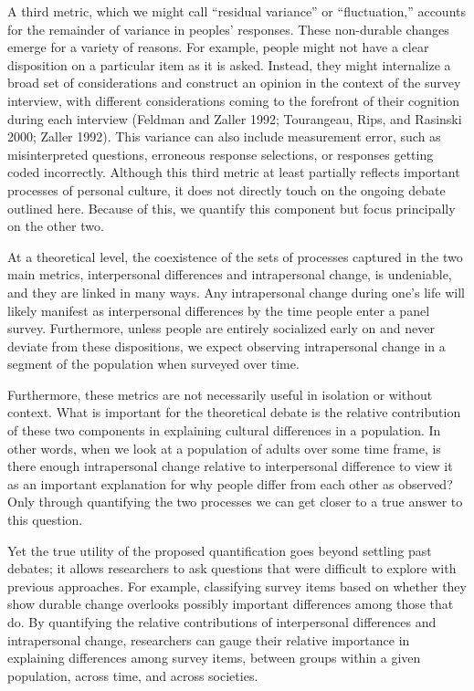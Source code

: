 \documentclass[
  12pt,
]{article}
\begin{document}
A third metric, which we might call ``residual variance'' or
``fluctuation,'' accounts for the remainder of variance in peoples'
responses. These non-durable changes emerge for a variety of reasons.
For example, people might not have a clear disposition on a particular
item as it is asked. Instead, they might internalize a broad set of
considerations and construct an opinion in the context of the survey
interview, with different considerations coming to the forefront of
their cognition during each interview (Feldman and Zaller 1992;
Tourangeau, Rips, and Rasinski 2000; Zaller 1992). This variance can
also include measurement error, such as misinterpreted questions,
erroneous response selections, or responses getting coded incorrectly.
Although this third metric at least partially reflects important
processes of personal culture, it does not directly touch on the ongoing
debate outlined here. Because of this, we quantify this component but
focus principally on the other two.

At a theoretical level, the coexistence of the sets of processes
captured in the two main metrics, interpersonal differences and
intrapersonal change, is undeniable, and they are linked in many ways.
Any intrapersonal change during one's life will likely manifest as
interpersonal differences by the time people enter a panel survey.
Furthermore, unless people are entirely socialized early on and never
deviate from these dispositions, we expect observing intrapersonal
change in a segment of the population when surveyed over time.

Furthermore, these metrics are not necessarily useful in isolation or
without context. What is important for the theoretical debate is the
relative contribution of these two components in explaining cultural
differences in a population. In other words, when we look at a
population of adults over some time frame, is there enough intrapersonal
change relative to interpersonal difference to view it as an important
explanation for why people differ from each other as observed? Only
through quantifying the two processes we can get closer to a true answer
to this question.

Yet the true utility of the proposed quantification goes beyond settling
past debates; it allows researchers to ask questions that were difficult
to explore with previous approaches. For example, classifying survey
items based on whether they show durable change overlooks possibly
important differences among those that do. By quantifying the relative
contributions of interpersonal differences and intrapersonal change,
researchers can gauge their relative importance in explaining
differences among survey items, between groups within a given
population, across time, and across societies.
\end{document}
